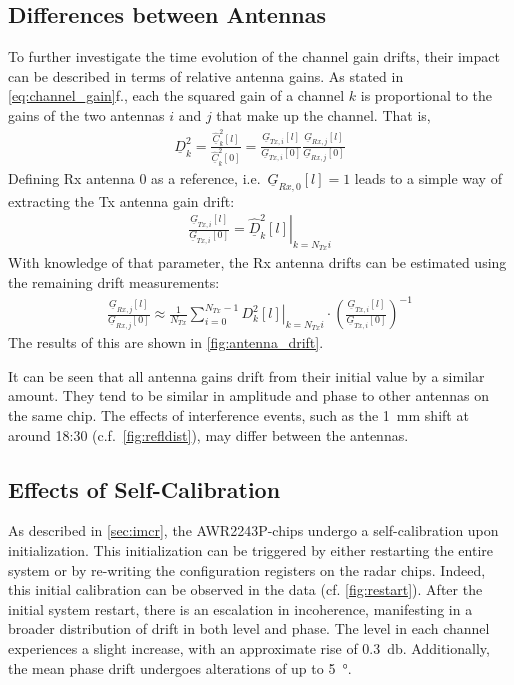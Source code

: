 \subsection{Differences between Antennas}
To further investigate the time evolution of the channel gain drifts,
their impact can be described in terms of relative antenna gains.
As stated in \cref{eq:channel_gain}f., each the squared gain of a channel $k$
is proportional to the gains of the two antennas $i$ and $j$ that make up the channel.
That is,
\begin{align*}
    \underline D_k^2 = \frac{\underline{\hat C}^2_k[l]}{\underline{\hat C}^2_k[0]}
    = \frac{\underline G_{Tx,i}[l]}{\underline G_{Tx,i}[0]}
    \frac{\underline G_{Rx,j}[l]}{\underline G_{Rx,j}[0]}
\end{align*}
Defining Rx antenna 0 as a reference, i.e.\ $\underline G_{Rx,0}[l] = 1$ leads to a simple way of extracting the Tx antenna gain drift:
\begin{align*}
    \frac{\underline G_{Tx,i}[l]}{\underline G_{Tx,i}[0]} = \left.\underline{\hat D}^2_k[l]\right|_{k=N_{Tx}i}
\end{align*}
With knowledge of that parameter, the Rx antenna drifts can be estimated using the remaining drift measurements: \\
\begin{align*}
    \frac{\underline G_{Rx,j}[l]}{\underline G_{Rx,j}[0]}
    \approx \frac{1}{N_{Tx}}\sum_{i=0}^{N_{Tx}-1} \left.D_k^2[l] \right|_{k=N_{Tx}i}
    \cdot \left(\frac{\underline G_{Tx,i}[l]}{\underline G_{Tx,i}[0]}\right)^{-1}
\end{align*}
The results of this are shown in \ref{fig:antenna_drift}.

It can be seen that all antenna gains drift from their initial value by a similar amount.
They tend to be similar in amplitude and phase to other antennas on the same chip.
The effects of interference events, such as the \SI{1}{\mm} shift at around 18:30 (c.f.~\ref{fig:refldist}),
may differ between the antennas.

\subsection{Effects of Self-Calibration}
As described in \cref{sec:imcr}, the AWR2243P-chips undergo a self-calibration upon initialization.
This initialization can be triggered by either restarting the entire system
or by re-writing the configuration registers on the radar chips.
Indeed, this initial calibration can be observed in the data (cf. \ref{fig:restart}).
After the initial system restart, there is an escalation in incoherence,
manifesting in a broader distribution of drift in both level and phase.
The level in each channel experiences a slight increase, with an approximate rise of \SI{0.3}{\decibel}.
Additionally, the mean phase drift undergoes alterations of up to \SI{5}{\degree}.



